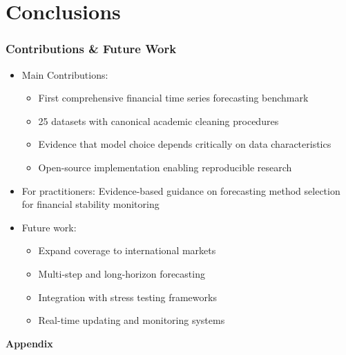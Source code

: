 \documentclass[ignorenonframetext, 9pt]{beamer}
\begin{document}
\section{Conclusions}

\begin{frame}
  \frametitle{Contributions \& Future Work}
  \begin{itemize}
  \item \alert{Main Contributions:}
  \begin{itemize}
    \item First comprehensive financial time series forecasting benchmark
    \item 25 datasets with canonical academic cleaning procedures
    \item Evidence that model choice depends critically on data characteristics
    \item Open-source implementation enabling reproducible research
  \end{itemize}
  \vspace{0.3cm}
  \item \alert{For practitioners:} Evidence-based guidance on forecasting method selection for financial stability monitoring
  \vspace{0.3cm}
  \item \alert{Future work:}
  \begin{itemize}
    \item Expand coverage to international markets
    \item Multi-step and long-horizon forecasting
    \item Integration with stress testing frameworks
    \item Real-time updating and monitoring systems
  \end{itemize}
  \end{itemize}
\end{frame}

\appendix
\begin{frame}
  \centering
  \textbf{Appendix}
\end{frame}
\end{document}
